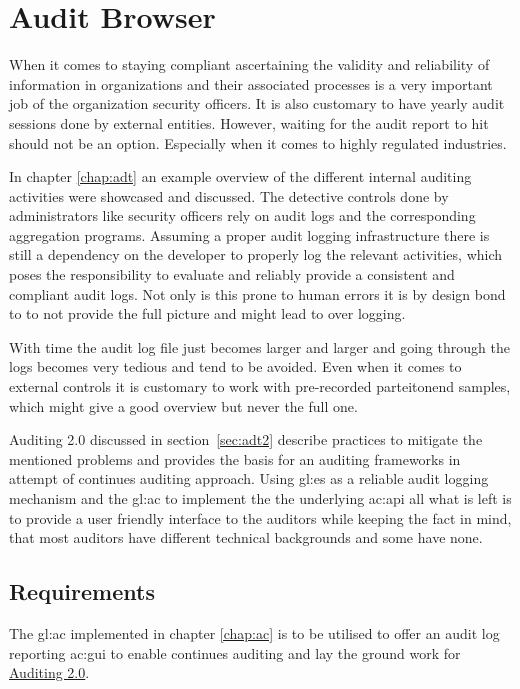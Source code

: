 %
\chapter{Audit Browser}\label{chap:ab}

When it comes to staying compliant ascertaining the validity and reliability of information in organizations and their associated processes is a very important job of the organization security officers. It is also customary to have yearly audit sessions done by external entities. However, waiting for the audit report to hit should not be an option. Especially when it comes to highly regulated industries.

In chapter \ref{chap:adt} an example overview of the different internal auditing activities were showcased and discussed. The detective controls done by administrators like security officers rely on audit logs and the corresponding aggregation programs. Assuming a proper audit logging infrastructure there is still a dependency on the developer to properly log the relevant activities, which poses the responsibility to evaluate and reliably provide a consistent and compliant audit logs. Not only is this prone to human errors it is by design bond to to not provide the full picture and might lead to over logging. 

With time the audit log file just becomes larger and larger and going through the logs becomes very tedious and tend to be avoided. Even when it comes to external controls it is customary to work with pre-recorded parteitonend samples, which might give a good overview but never the full one. 

Auditing 2.0 discussed in section~\ref{sec:adt2} describe practices to mitigate the mentioned problems and provides the basis for an auditing frameworks in attempt of continues auditing approach. Using \gls{gl:es} as a reliable audit logging mechanism and the \gls{gl:ac} to implement the the underlying \gls{ac:api} all what is left is to provide a user friendly interface to the auditors while keeping the fact in mind, that most auditors have different technical backgrounds and some have none.

\section{Requirements}

The \gls{gl:ac} implemented in chapter \ref{chap:ac} is to be utilised to offer an audit log reporting \gls{ac:gui} to enable continues auditing and lay the ground work for \hyperref[sec:adt2]{Auditing 2.0}.

